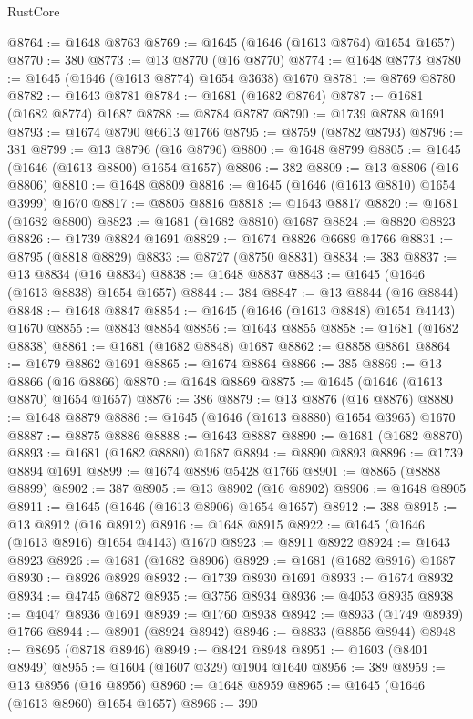 \begin{lexlean}{RustCore}
\begin{coremodule}
@8764 := @1648 @8763
@8769 := @1645 (@1646 (@1613 @8764) @1654 @1657)
@8770 := 380
@8773 := @13 @8770 (@16 @8770)
@8774 := @1648 @8773
@8780 := @1645 (@1646 (@1613 @8774) @1654 @3638) @1670
@8781 := @8769 @8780
@8782 := @1643 @8781
@8784 := @1681 (@1682 @8764)
@8787 := @1681 (@1682 @8774) @1687
@8788 := @8784 @8787
@8790 := @1739 @8788 @1691
@8793 := @1674 @8790 @6613 @1766
@8795 := @8759 (@8782 @8793)
@8796 := 381
@8799 := @13 @8796 (@16 @8796)
@8800 := @1648 @8799
@8805 := @1645 (@1646 (@1613 @8800) @1654 @1657)
@8806 := 382
@8809 := @13 @8806 (@16 @8806)
@8810 := @1648 @8809
@8816 := @1645 (@1646 (@1613 @8810) @1654 @3999) @1670
@8817 := @8805 @8816
@8818 := @1643 @8817
@8820 := @1681 (@1682 @8800)
@8823 := @1681 (@1682 @8810) @1687
@8824 := @8820 @8823
@8826 := @1739 @8824 @1691
@8829 := @1674 @8826 @6689 @1766
@8831 := @8795 (@8818 @8829)
@8833 := @8727 (@8750 @8831)
@8834 := 383
@8837 := @13 @8834 (@16 @8834)
@8838 := @1648 @8837
@8843 := @1645 (@1646 (@1613 @8838) @1654 @1657)
@8844 := 384
@8847 := @13 @8844 (@16 @8844)
@8848 := @1648 @8847
@8854 := @1645 (@1646 (@1613 @8848) @1654 @4143) @1670
@8855 := @8843 @8854
@8856 := @1643 @8855
@8858 := @1681 (@1682 @8838)
@8861 := @1681 (@1682 @8848) @1687
@8862 := @8858 @8861
@8864 := @1679 @8862 @1691
@8865 := @1674 @8864
@8866 := 385
@8869 := @13 @8866 (@16 @8866)
@8870 := @1648 @8869
@8875 := @1645 (@1646 (@1613 @8870) @1654 @1657)
@8876 := 386
@8879 := @13 @8876 (@16 @8876)
@8880 := @1648 @8879
@8886 := @1645 (@1646 (@1613 @8880) @1654 @3965) @1670
@8887 := @8875 @8886
@8888 := @1643 @8887
@8890 := @1681 (@1682 @8870)
@8893 := @1681 (@1682 @8880) @1687
@8894 := @8890 @8893
@8896 := @1739 @8894 @1691
@8899 := @1674 @8896 @5428 @1766
@8901 := @8865 (@8888 @8899)
@8902 := 387
@8905 := @13 @8902 (@16 @8902)
@8906 := @1648 @8905
@8911 := @1645 (@1646 (@1613 @8906) @1654 @1657)
@8912 := 388
@8915 := @13 @8912 (@16 @8912)
@8916 := @1648 @8915
@8922 := @1645 (@1646 (@1613 @8916) @1654 @4143) @1670
@8923 := @8911 @8922
@8924 := @1643 @8923
@8926 := @1681 (@1682 @8906)
@8929 := @1681 (@1682 @8916) @1687
@8930 := @8926 @8929
@8932 := @1739 @8930 @1691
@8933 := @1674 @8932
@8934 := @4745 @6872
@8935 := @3756 @8934
@8936 := @4053 @8935
@8938 := @4047 @8936 @1691
@8939 := @1760 @8938
@8942 := @8933 (@1749 @8939) @1766
@8944 := @8901 (@8924 @8942)
@8946 := @8833 (@8856 @8944)
@8948 := @8695 (@8718 @8946)
@8949 := @8424 @8948
@8951 := @1603 (@8401 @8949)
@8955 := @1604 (@1607 @329) @1904 @1640
@8956 := 389
@8959 := @13 @8956 (@16 @8956)
@8960 := @1648 @8959
@8965 := @1645 (@1646 (@1613 @8960) @1654 @1657)
@8966 := 390

\end{coremodule}
\end{lexlean}
